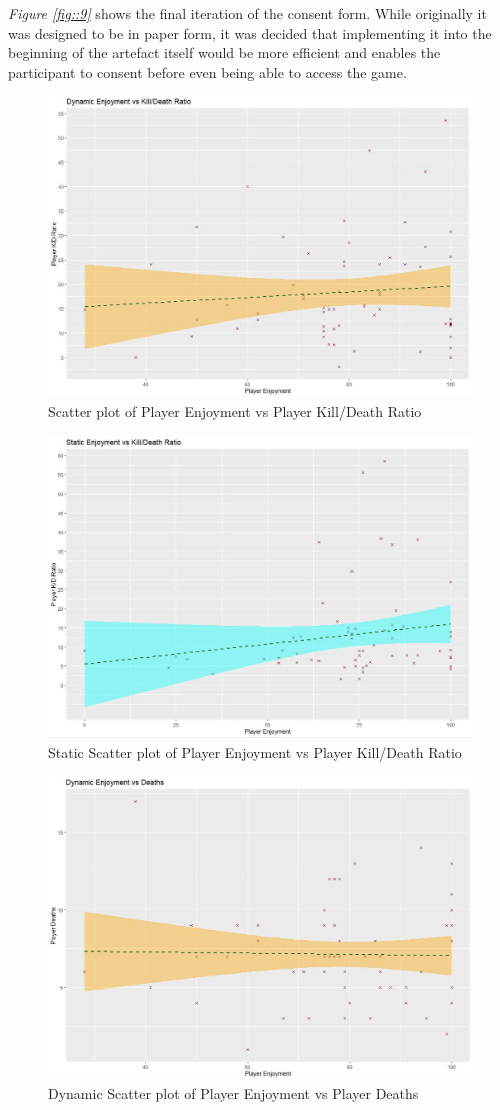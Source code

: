 \documentclass[journal]{IEEEtran}
\begin{document}
\textit{Figure \ref{fig::9}} shows the final iteration of the consent form. While originally it was designed to be in paper form, it was decided that implementing it into the beginning of the artefact itself would be more efficient and enables the participant to consent before even being able to access the game.

\newpage

\begin{figure}[h]
	\includegraphics[width=0.75\linewidth]{dynamicfunKDR.jpg}
	\caption{Scatter plot of Player Enjoyment vs Player Kill/Death Ratio}
	\label{fig::11}
\end{figure} 

\begin{figure}[h]
	\includegraphics[width=0.75\linewidth]{staticfunKDR.jpg}
	\caption{Static Scatter plot of Player Enjoyment vs Player Kill/Death Ratio}
	\label{fig::12}
\end{figure} 

\begin{figure}[h]
	\includegraphics[width=0.75\linewidth]{dynamicfundeath.jpg}
	\caption{Dynamic Scatter plot of Player Enjoyment vs Player Deaths}
	\label{fig::13}
\end{figure} 
\end{document}
